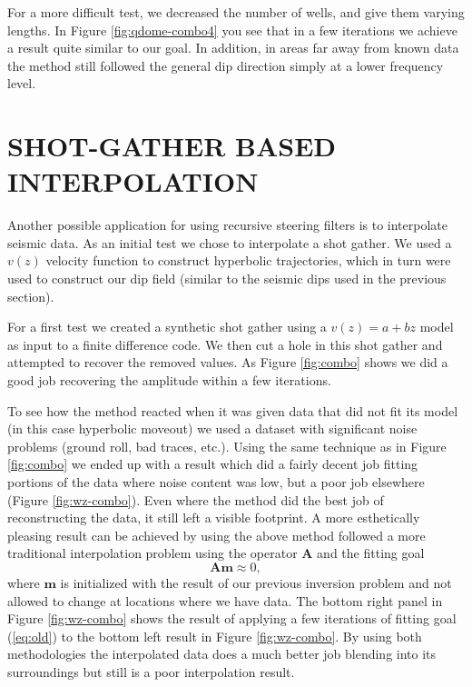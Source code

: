 
\par
For a more difficult test, we decreased the number of wells, and give
them varying lengths.
In Figure \ref{fig:qdome-combo4} you see that in a few iterations
we  achieve a result quite similar
to our goal. In addition, in areas far away from known data the method
still followed the general dip direction simply at a lower frequency level.



\section{SHOT-GATHER BASED INTERPOLATION}

Another possible application for using recursive
steering filters is to interpolate
seismic data.  As an initial test 
we chose to interpolate 
a shot gather.  We used a $v(z)$ velocity function to construct
hyperbolic trajectories, which in turn were used to
construct our dip
field (similar to the seismic dips used in the previous section).
\par
For a first test
we created a synthetic shot gather using a $v(z)=a+bz$ model as input
to a finite difference code.  We then cut
a hole in this shot gather  and attempted
to recover the removed values.
As Figure \ref{fig:combo} shows we did a good job 
recovering the amplitude within a few iterations.

\par
To see how the method reacted when it was given data that did not
fit its model (in this case hyperbolic moveout) we used a dataset with
significant noise problems (ground roll, bad traces, etc.).  Using
the same technique as in Figure \ref{fig:combo} 
we ended up with a result which did a fairly
decent job fitting portions of the data where noise content was low,
but a poor job elsewhere (Figure \ref{fig:wz-combo}).  Even  where
the method did the best job of reconstructing the data, it still left
a visible footprint. A more esthetically pleasing result can be achieved
by using the above method followed a more traditional interpolation problem
using  the operator $\mathbf A$ and the fitting goal
\begin{equation}
\mathbf A \mathbf m \approx 0 ,
\label{eq:old}
\end{equation}
where  $\mathbf m$ is initialized with the result of our previous 
inversion problem and not allowed to change at locations where we have data.
The bottom right panel in Figure \ref{fig:wz-combo}  shows
the result of applying a few iterations of fitting goal (\ref{eq:old}) 
to the bottom left result in Figure \ref{fig:wz-combo}.
By using  both methodologies the interpolated data does a much better job 
blending into its
surroundings but still is a poor interpolation result.

